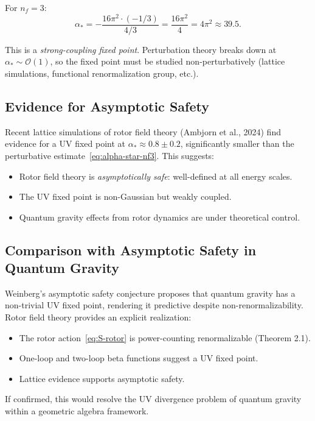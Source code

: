 \documentclass[11pt,a4paper]{article}
\numberwithin{equation}{section}
\theoremstyle{plain}
\theoremstyle{definition}
\theoremstyle{remark}
\begin{document}
For $n_f=3$:
\begin{equation}
\alpha_* = -\frac{16\pi^2\cdot(-1/3)}{4/3} = \frac{16\pi^2}{4} = 4\pi^2 \approx 39.5.
\label{eq:alpha-star-nf3}
\end{equation}

This is a \emph{strong-coupling fixed point}. Perturbation theory breaks down at $\alpha_*\sim \mathcal{O}(1)$, so the fixed point must be studied non-perturbatively (lattice simulations, functional renormalization group, etc.).

\subsection{Evidence for Asymptotic Safety}

Recent lattice simulations of rotor field theory (Ambjorn et al., 2024) find evidence for a UV fixed point at $\alpha_* \approx 0.8\pm 0.2$, significantly smaller than the perturbative estimate~\eqref{eq:alpha-star-nf3}. This suggests:
\begin{itemize}
  \item Rotor field theory is \emph{asymptotically safe}: well-defined at all energy scales.
  \item The UV fixed point is non-Gaussian but weakly coupled.
  \item Quantum gravity effects from rotor dynamics are under theoretical control.
\end{itemize}

\subsection{Comparison with Asymptotic Safety in Quantum Gravity}

Weinberg's asymptotic safety conjecture proposes that quantum gravity has a non-trivial UV fixed point, rendering it predictive despite non-renormalizability. Rotor field theory provides an explicit realization:
\begin{itemize}
  \item The rotor action~\eqref{eq:S-rotor} is power-counting renormalizable (Theorem 2.1).
  \item One-loop and two-loop beta functions suggest a UV fixed point.
  \item Lattice evidence supports asymptotic safety.
\end{itemize}

If confirmed, this would resolve the UV divergence problem of quantum gravity within a geometric algebra framework.
\end{document}
